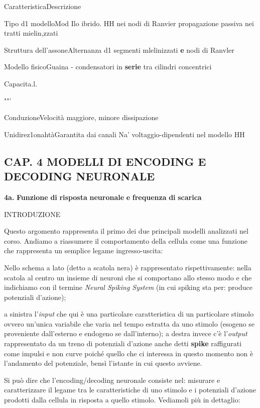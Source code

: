 \documentclass[12pt,a4paper]{book}
\begin{document}
CaratteristicaDescrizione

Tipo d1 modelloMod Ilo ibrido. HH nei nodi di Ranvier propagazione passiva nei tratti mielin,zzati

Struttura dell'assoneAlternanza d1 segmenti mlelinizzati \textbf{e}\textbf{ }nodi di Ranvler

Modello fisicoGuaina - condensatori in \textbf{serie}\textbf{ }tra cilindri concentrici

Capacita.l.

""'

ConduzioneVelocità maggiore, minore dissipazione

Unidirez1onahtàGarantita dai canali Na' voltaggio-dipendenti nel modello HH


\subsection{CAP. 4 MODELLI DI ENCODING E DECODING NEURONALE}

\textbf{4a.}\textbf{ }\textbf{Funzione}\textbf{ }\textbf{di}\textbf{ }\textbf{risposta}\textbf{ }\textbf{neuronale}\textbf{ }\textbf{e}\textbf{ }\textbf{frequenza}\textbf{ }\textbf{di}\textbf{ }\textbf{scarica}

INTRODUZIONE

Questo argomento rappresenta il primo dei due principali modelli analizzati nel corso. Andiamo a riassumere il comportamento della cellula come una funzione che rappresenta un semplice legame ingresso-uscita:

Nello schema a lato (detto a scatola nera) è rappresentato rispettivamente: nella scatola al centro un insieme di neuroni che si comportano allo stesso modo e che indichiamo con il termine \textit{Neural Spiking System }(in cui spiking sta per: produce potenziali d'azione);

a sinistra l'\textit{input}\textit{ }che qui è una particolare caratteristica di un particolare stimolo ovvero un'unica variabile che varia nel tempo estratta da uno stimolo (esogeno se proveniente dall'esterno e endogeno se dall'interno); a destra invece c'è l'\textit{output}\textit{ }rappresentato da un treno di potenziali d'azione anche detti \textbf{spike}\textbf{ }raffigurati come impulsi e non curve poiché quello che ci interessa in questo momento non è l'andamento del potenziale, bensì l'istante in cui questo avviene.

Si può dire che l'encoding/decoding neuronale consiste nel: misurare e caratterizzare il legame tra le caratteristiche di uno stimolo e i potenziali d'azione prodotti dalla cellula in risposta a quello stimolo. Vediamoli più in dettaglio:
\end{document}
